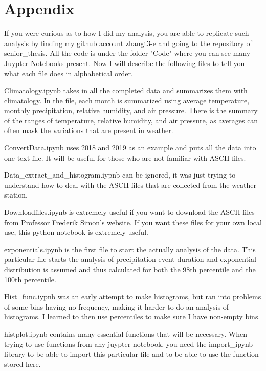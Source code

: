 \documentclass[11pt]{report}
\begin{document}
\renewcommand{\bibname}{References}



\clearpage

	\section{Appendix} 
	If you were curious as to how I did my analysis, you are able to replicate such analysis by finding my github account zhangt3-e and going to the repository of senior\_thesis. All the code is under the folder "Code" where you can see many Juypter Notebooks present. Now I will describe the following files to tell you what each file does in alphabetical order. 
	
	Climatology.ipynb takes in all the completed data and summarizes them with climatology. In the file, each month is summarized using average temperature, monthly precipitation, relative humidity, and air pressure. There is the summary of the ranges of temperature, relative humidity, and air pressure, as averages can often mask the variations that are present in weather. 
	
	ConvertData.ipynb uses 2018 and 2019 as an example and puts all the data into one text file. It will be useful for those who are not familiar with ASCII files. 
	
	Data\_extract\_and\_histogram.iypnb can be ignored, it was just trying to understand how to deal with the ASCII files that are collected from the weather station. 
	
	Downloadfiles.ipynb is extremely useful if you want to download the ASCII files from Professor Frederik Simon's website. If you want these files for your own local use, this python notebook is extremely useful. 
	
	exponentials.ipynb is the first file to start the actually analysis of the data. This particular file starts the analysis of precipitation event duration and exponential distribution is assumed and thus calculated for both the 98th percentile and the 100th percentile. 
	
	Hist\_func.iypnb was an early attempt to make histograms, but ran into problems of some bins having no frequency, making it harder to do an analysis of histograms. I learned to then use percentiles to make sure I have non-empty bins.
	
	histplot.ipynb contains many essential functions that will be necessary. When trying to use functions from any juypter notebook, you need the import\_ipynb library to be able to import this particular file and to be able to use the function stored here. 
	
\end{document}
